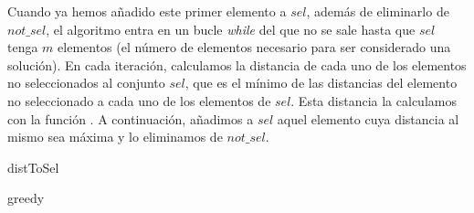 \documentclass[10pt,a4paper]{article}
\begin{document}
Cuando ya hemos añadido este primer elemento a $sel$, además de eliminarlo de $not\_sel$, el algoritmo entra en un bucle \textit{while} del que no se sale hasta que $sel$ tenga $m$ elementos (el número de elementos necesario para ser considerado una solución). En cada iteración, calculamos la distancia de cada uno de los elementos no seleccionados al conjunto $sel$, que es el mínimo de las distancias del elemento no seleccionado a cada uno de los elementos de $sel$. Esta distancia la calculamos con la función . A continuación, añadimos a $sel$ aquel elemento cuya distancia al mismo sea máxima y lo eliminamos de $not\_sel$.

\begin{algorithm}
	\caption{distToSel}
\end{algorithm}

\begin{algorithm}[H]
	\caption{greedy}
\end{algorithm}
\end{document}
